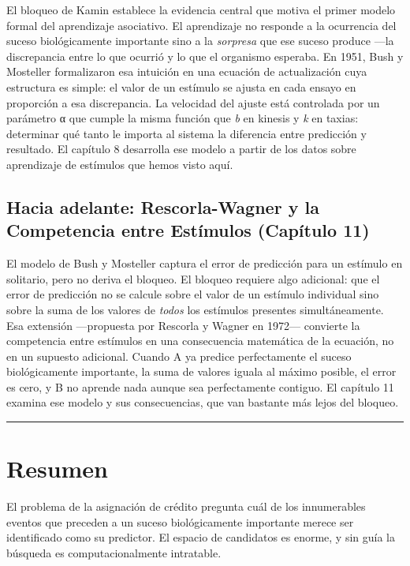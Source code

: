 \documentclass[
  letterpaper,
  DIV=11,
  numbers=noendperiod]{scrreprt}
\begin{document}
\begin{tcolorbox}[enhanced jigsaw, arc=.35mm, bottomrule=.15mm, breakable, colback=white, colframe=quarto-callout-note-color-frame, left=2mm, leftrule=.75mm, opacityback=0, rightrule=.15mm, toprule=.15mm]
El bloqueo de Kamin establece la evidencia central que motiva el primer
modelo formal del aprendizaje asociativo. El aprendizaje no responde a
la ocurrencia del suceso biológicamente importante sino a la
\emph{sorpresa} que ese suceso produce ---la discrepancia entre lo que
ocurrió y lo que el organismo esperaba. En 1951, Bush y Mosteller
formalizaron esa intuición en una ecuación de actualización cuya
estructura es simple: el valor de un estímulo se ajusta en cada ensayo
en proporción a esa discrepancia. La velocidad del ajuste está
controlada por un parámetro α que cumple la misma función que \emph{b}
en kinesis y \emph{k} en taxias: determinar qué tanto le importa al
sistema la diferencia entre predicción y resultado. El capítulo 8
desarrolla ese modelo a partir de los datos sobre aprendizaje de
estímulos que hemos visto aquí.

\subsection{Hacia adelante: Rescorla-Wagner y la Competencia entre
Estímulos (Capítulo
11)}\label{hacia-adelante-rescorla-wagner-y-la-competencia-entre-estuxedmulos-capuxedtulo-11}

El modelo de Bush y Mosteller captura el error de predicción para un
estímulo en solitario, pero no deriva el bloqueo. El bloqueo requiere
algo adicional: que el error de predicción no se calcule sobre el valor
de un estímulo individual sino sobre la suma de los valores de
\emph{todos} los estímulos presentes simultáneamente. Esa extensión
---propuesta por Rescorla y Wagner en 1972--- convierte la competencia
entre estímulos en una consecuencia matemática de la ecuación, no en un
supuesto adicional. Cuando A ya predice perfectamente el suceso
biológicamente importante, la suma de valores iguala al máximo posible,
el error es cero, y B no aprende nada aunque sea perfectamente contiguo.
El capítulo 11 examina ese modelo y sus consecuencias, que van bastante
más lejos del bloqueo.

\begin{center}\rule{0.5\linewidth}{0.5pt}\end{center}

\section{Resumen}\label{resumen-2}

El problema de la asignación de crédito pregunta cuál de los
innumerables eventos que preceden a un suceso biológicamente importante
merece ser identificado como su predictor. El espacio de candidatos es
enorme, y sin guía la búsqueda es computacionalmente intratable.


\end{tcolorbox}
\end{document}
